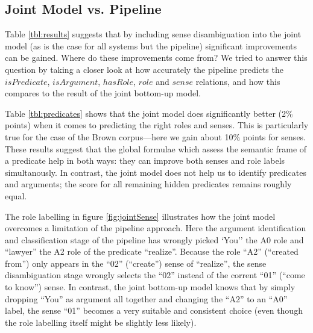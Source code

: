 \subsection{Joint Model vs. Pipeline}
Table \ref{tbl:results} suggests that by including sense disambiguation into the joint model (as is the case for all systems but the pipeline) significant improvements can be gained. Where do these improvements come from? We tried to answer this question by taking a closer look at how accurately the pipeline predicts the $isPredicate$, $isArgument$, $hasRole$, $role$ and $sense$ relations, and how this compares to the result of the joint bottom-up model.

Table \ref{tbl:predicates} shows that the joint model does significantly better (2\% points) when it comes to predicting the right roles and senses. This is particularly true for the case of the Brown corpus---here we gain about 10\% points for senses. These results suggest that the global formulae which assess the semantic frame of a predicate help in both ways: they can improve both senses and role labels simultanously. In contrast, the joint model does not help us to identify predicates and arguments; the score for all remaining hidden predicates remains roughly equal. 

The role labelling in figure \ref{fig:jointSense} illustrates how the joint model overcomes a limitation of the pipeline approach. Here the argument identification and classification stage of the pipeline has wrongly picked `You'' the A0 role and ``lawyer'' the A2 role of the predicate ``realize''. Because the role ``A2'' (``created from'') only appears in the  ``02'' (``create'') sense of ``realize'', the sense disambiguation stage wrongly selects the ``02'' instead of the corrent ``01'' (``come to know'') sense. In contrast, the joint bottom-up model knows that by simply dropping ``You'' as argument all together and changing the ``A2'' to an ``A0'' label, the sense ``01'' becomes a very suitable and consistent choice (even though the role labelling itself might be slightly less likely).

